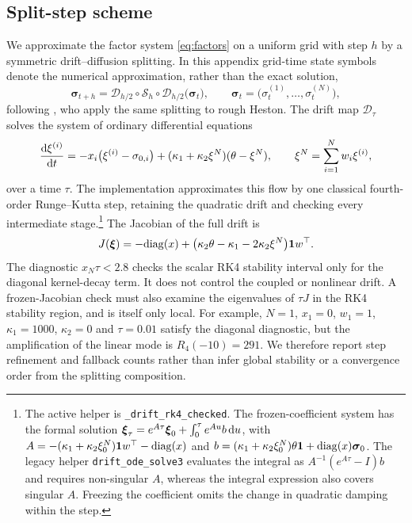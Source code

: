 \subsection{Split-step scheme}\label{sec:split_step}

We approximate the factor system \eqref{eq:factors} on a uniform grid with step $h$ by a symmetric drift--diffusion splitting. In this appendix grid-time state symbols denote the numerical approximation, rather than the exact solution,
\begin{equation}\label{eq:strang}
\boldsymbol\sigma_{t+h}=\mathcal{D}_{h/2}\circ\mathcal{S}_h\circ\mathcal{D}_{h/2}\big(\boldsymbol\sigma_t\big),\qquad \boldsymbol\sigma_t=\big(\sigma^{(1)}_t,\dots,\sigma^{(N)}_t\big),
\end{equation}
following \citet{BayerBreneis2024}, who apply the same splitting to rough Heston. The drift map $\mathcal{D}_\tau$ solves the system of ordinary differential equations
\begin{equation}\label{eq:drift_ode}
\frac{\D\xi^{(i)}}{\D t}=-x_i\big(\xi^{(i)}-\sigma_{0,i}\big)+(\kappa_1+\kappa_2\xi^N)(\theta-\xi^N),\qquad \xi^N=\sum_{i=1}^Nw_i\xi^{(i)},
\end{equation}
over a time $\tau$. The implementation approximates this flow by one classical fourth-order Runge--Kutta step, retaining the quadratic drift and checking every intermediate stage.\footnote{The active helper is \texttt{\_drift\_rk4\_checked}. The frozen-coefficient system has the formal solution $\boldsymbol\xi_\tau=e^{A\tau}\boldsymbol\xi_0+\int_0^\tau e^{Au}b\,\mathrm{d} u$, with $A=-(\kappa_1+\kappa_2\xi^N_0)\mathbf{1} w^\top-\mathrm{diag}(x)$ and $b=(\kappa_1+\kappa_2\xi^N_0)\theta\mathbf{1}+\mathrm{diag}(x)\boldsymbol\sigma_0$. The legacy helper \texttt{drift\_ode\_solve3} evaluates the integral as $A^{-1}(e^{A\tau}-I)b$ and requires non-singular $A$, whereas the integral expression also covers singular $A$. Freezing the coefficient omits the change in quadratic damping within the step.} The Jacobian of the full drift is
\begin{equation*}
J(\boldsymbol\xi)=-\mathrm{diag}(x)+\big(\kappa_2\theta-\kappa_1-2\kappa_2\xi^N\big)\mathbf{1} w^\top.
\end{equation*}
The diagnostic $x_N\tau<2.8$ checks the scalar RK4 stability interval only for the diagonal kernel-decay term. It does not control the coupled or nonlinear drift. A frozen-Jacobian check must also examine the eigenvalues of $\tau J$ in the RK4 stability region, and is itself only local. For example, $N=1$, $x_1=0$, $w_1=1$, $\kappa_1=1000$, $\kappa_2=0$ and $\tau=0.01$ satisfy the diagonal diagnostic, but the amplification of the linear mode is $R_4(-10)=291$. We therefore report step refinement and fallback counts rather than infer global stability or a convergence order from the splitting composition.

